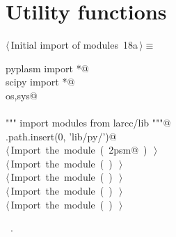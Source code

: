 \documentclass[11pt,oneside]{article}	%
\begin{document}
\appendix
\section{Utility functions}

\begin{flushleft} \small \label{scrap41}
\protect{}$\langle\,$Initial import of modules\nobreak\ {\footnotesize 18a}$\,\rangle\equiv$
\vspace{-1ex}
\begin{list}{}{} \item
\mbox{}\verb@from pyplasm import *@\\
\mbox{}\verb@from scipy import *@\\
\mbox{}\verb@import os,sys@\\
\mbox{}\verb@@\\
\mbox{}\verb@""" import modules from larcc/lib """@\\
\mbox{}\verb@sys.path.insert(0, 'lib/py/')@\\
\mbox{}\verb@@\hbox{$\langle\,$Import the module\nobreak\ ({\footnotesize {}\label{scrap42}
 }\mbox{}\verb@lar2psm@ ) {\footnotesize {}}$\,\rangle$}\verb@@\\
\mbox{}\verb@@\hbox{$\langle\,$Import the module\nobreak\ ({\footnotesize {}\label{scrap43}
 }\mbox{}\verb@simplexn@ ) {\footnotesize {}}$\,\rangle$}\verb@@\\
\mbox{}\verb@@\hbox{$\langle\,$Import the module\nobreak\ ({\footnotesize {}\label{scrap44}
 }\mbox{}\verb@larcc@ ) {\footnotesize {}}$\,\rangle$}\verb@@\\
\mbox{}\verb@@\hbox{$\langle\,$Import the module\nobreak\ ({\footnotesize {}\label{scrap45}
 }\mbox{}\verb@largrid@ ) {\footnotesize {}}$\,\rangle$}\verb@@\\
\mbox{}\verb@@\hbox{$\langle\,$Import the module\nobreak\ ({\footnotesize {}\label{scrap46}
 }\mbox{}\verb@myfont@ ) {\footnotesize {}}$\,\rangle$}\verb@@\\
\mbox{}\verb@@{\NWsep}
\end{list}
\vspace{-1ex}
\footnotesize\addtolength{\baselineskip}{-1ex}
\begin{list}{}{\setlength{\itemsep}{-\parsep}\setlength{\itemindent}{-\leftmargin}}
\item \NWtxtMacroRefIn\ .
\end{list}
\end{flushleft}
\end{document}
